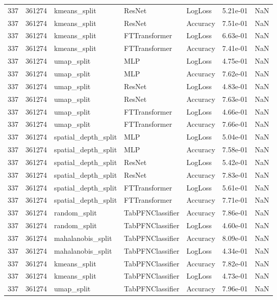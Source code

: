 \begin{tabular}{rrlllrr}
337 & 361274 & kmeans\_split & ResNet & LogLoss & 5.21e-01 & NaN \\
337 & 361274 & kmeans\_split & ResNet & Accuracy & 7.51e-01 & NaN \\
337 & 361274 & kmeans\_split & FTTransformer & LogLoss & 6.63e-01 & NaN \\
337 & 361274 & kmeans\_split & FTTransformer & Accuracy & 7.41e-01 & NaN \\
337 & 361274 & umap\_split & MLP & LogLoss & 4.75e-01 & NaN \\
337 & 361274 & umap\_split & MLP & Accuracy & 7.62e-01 & NaN \\
337 & 361274 & umap\_split & ResNet & LogLoss & 4.83e-01 & NaN \\
337 & 361274 & umap\_split & ResNet & Accuracy & 7.63e-01 & NaN \\
337 & 361274 & umap\_split & FTTransformer & LogLoss & 4.66e-01 & NaN \\
337 & 361274 & umap\_split & FTTransformer & Accuracy & 7.66e-01 & NaN \\
337 & 361274 & spatial\_depth\_split & MLP & LogLoss & 5.04e-01 & NaN \\
337 & 361274 & spatial\_depth\_split & MLP & Accuracy & 7.58e-01 & NaN \\
337 & 361274 & spatial\_depth\_split & ResNet & LogLoss & 5.42e-01 & NaN \\
337 & 361274 & spatial\_depth\_split & ResNet & Accuracy & 7.83e-01 & NaN \\
337 & 361274 & spatial\_depth\_split & FTTransformer & LogLoss & 5.61e-01 & NaN \\
337 & 361274 & spatial\_depth\_split & FTTransformer & Accuracy & 7.71e-01 & NaN \\
337 & 361274 & random\_split & TabPFNClassifier & Accuracy & 7.86e-01 & NaN \\
337 & 361274 & random\_split & TabPFNClassifier & LogLoss & 4.60e-01 & NaN \\
337 & 361274 & mahalanobis\_split & TabPFNClassifier & Accuracy & 8.09e-01 & NaN \\
337 & 361274 & mahalanobis\_split & TabPFNClassifier & LogLoss & 4.34e-01 & NaN \\
337 & 361274 & kmeans\_split & TabPFNClassifier & Accuracy & 7.82e-01 & NaN \\
337 & 361274 & kmeans\_split & TabPFNClassifier & LogLoss & 4.73e-01 & NaN \\
337 & 361274 & umap\_split & TabPFNClassifier & Accuracy & 7.96e-01 & NaN \\

\end{tabular}
